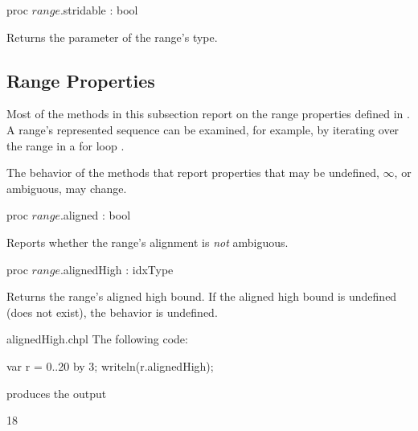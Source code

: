 \begin{protohead}
proc $range$.stridable : bool
\end{protohead}
\begin{protobody}
Returns the  parameter of the range's type.
\end{protobody}

\subsection{Range Properties}
\label{Range_Properties}

Most of the methods in this subsection report on
the range properties defined in .
A range's represented sequence can be examined, for example,
by iterating over the range in a for loop .

\begin{openissue}
The behavior of the methods that report properties that may be
undefined, $\infty$, or ambiguous, may change.
\end{openissue}

\begin{protohead}
proc $range$.aligned : bool
\end{protohead}
\begin{protobody}
Reports whether the range's alignment is \emph{not} ambiguous.
\end{protobody}

\begin{protohead}
proc $range$.alignedHigh : idxType
\end{protohead}
\begin{protobody}
Returns the range's aligned high bound.
If the aligned high bound is undefined (does not exist),
the behavior is undefined.
\end{protobody}
\begin{chapelexample}{alignedHigh.chpl}
The following code:
\begin{chapel}
var r = 0..20 by 3;
writeln(r.alignedHigh);
\end{chapel}
produces the output
\begin{chapelprintoutput}{}
18
\end{chapelprintoutput}
\end{chapelexample}


